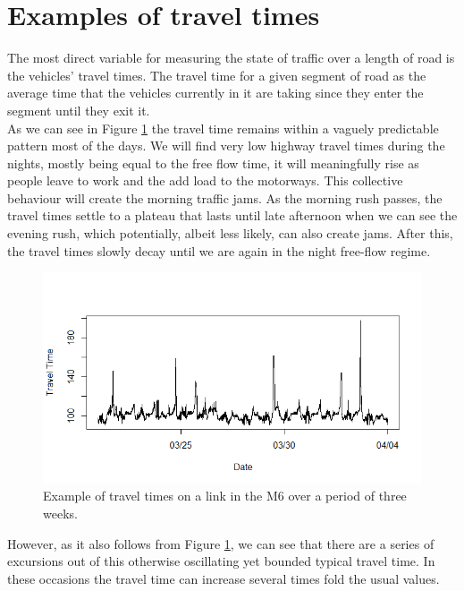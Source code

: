 \documentclass[conference]{IEEEtran}
\begin{document}
\section{Examples of travel times} 
The most direct variable for measuring the state of traffic over a length of road is the vehicles' travel times. 
The travel time for a given segment of road as the average time that the vehicles currently in it are taking since they enter the segment until they exit it.\\

As we can see in Figure \ref{fig:travel_time_example} the travel time remains within a vaguely predictable pattern most of the days. 
We will find very low highway travel times during the nights, mostly being equal to the free flow time, it will meaningfully rise as people leave to work and the add load to the motorways. 
This collective behaviour will create the morning traffic jams. As the morning rush passes, the travel times settle to a plateau that lasts until late afternoon when we can see the evening rush, which potentially, albeit less likely, can also create jams. 
After this, the travel times slowly decay until we are again in the night free-flow regime.

\begin{figure}[htbp]
	\centerline{\includegraphics[width=\linewidth]{./images/Traveltime_example.png}}
	\caption{Example of travel times on a link in the M6 over a period of three weeks.}
	\label{fig:travel_time_example}
\end{figure}

However, as it also follows from Figure \ref{fig:travel_time_example}, we can see that there are a series of excursions out of this otherwise oscillating yet bounded typical travel time. 
In these occasions the travel time can increase several times fold the usual values. 
\end{document}
